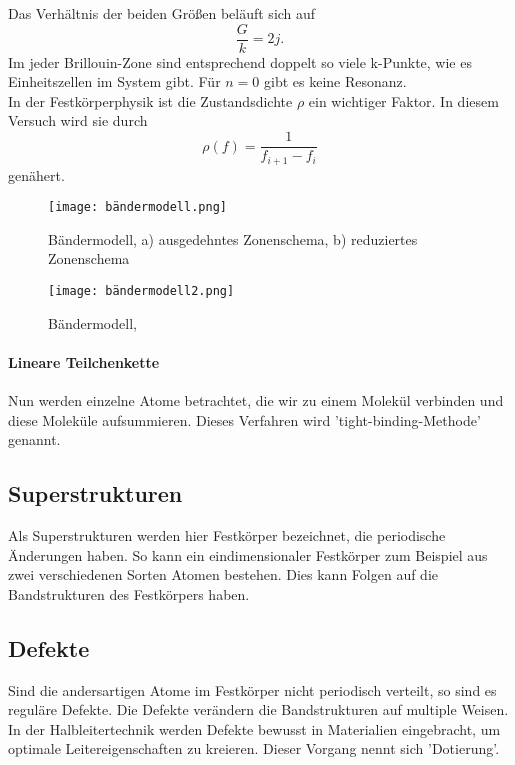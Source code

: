 Das Verhältnis der beiden Größen beläuft sich auf
\begin{equation*}
  \frac{G}{k} = 2 j.
\end{equation*}
Im jeder Brillouin-Zone sind entsprechend doppelt so viele k-Punkte, wie es Einheitszellen im System gibt.
Für $n=0$ gibt es keine Resonanz.\\
In der Festkörperphysik ist die Zustandsdichte $\rho$ ein wichtiger Faktor.
In diesem Versuch wird sie durch
\begin{equation}
  \rho(f) = \frac{1}{f_{i+1}-f_{i}}
  \label{eqn:zustandsdichte}
\end{equation}
genähert.
\begin{figure}[h!]
  \centering
  \texttt{[image: bändermodell.png]}
  \caption{Bändermodell, a) ausgedehntes Zonenschema, b) reduziertes Zonenschema \cite{bändermodell}}
  \label{fig:bändermodell}
\end{figure}
\begin{figure}[h!]
  \centering
  \texttt{[image: bändermodell2.png]}
  \caption{Bändermodell, \cite{bändermodell2}}
  \label{fig:bändermodell2}
\end{figure}
\FloatBarrier
%
\paragraph{Lineare Teilchenkette}
Nun werden einzelne Atome betrachtet, die wir zu einem Molekül verbinden und diese Moleküle aufsummieren.
Dieses Verfahren wird 'tight-binding-Methode' genannt.
%
\subsection{Superstrukturen}
Als Superstrukturen werden hier Festkörper bezeichnet, die periodische Änderungen haben.
So kann ein eindimensionaler Festkörper zum Beispiel aus zwei verschiedenen Sorten Atomen bestehen.
Dies kann Folgen auf die Bandstrukturen des Festkörpers haben.
%
\subsection{Defekte}
Sind die andersartigen Atome im Festkörper nicht periodisch verteilt, so sind es reguläre Defekte.
Die Defekte verändern die Bandstrukturen auf multiple Weisen.
In der Halbleitertechnik werden Defekte bewusst in Materialien eingebracht, um optimale Leitereigenschaften zu kreieren.
Dieser Vorgang nennt sich 'Dotierung'.
%
